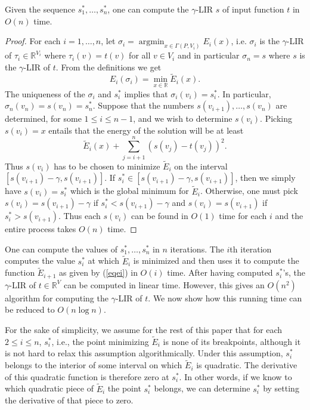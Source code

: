 \documentclass[11pt]{article}
\def\argmin{\mathop{\text{argmin}}}
\begin{document}
\begin{lemma}\label{lem:backsolve}
Given the sequence $s^*_1, \dots, s^*_n$, one can compute the $\gamma$-LIR $s$ of input function $t$ in $O(n)$ time. 
\end{lemma}
\begin{proof}For each $i = 1, \dots, n$, let $\sigma_{i} = \argmin_{x \in \Gamma(P, {V_i})} E_i(x)$, i.e. $\sigma_i$ is the $\gamma$-LIR of $\tau_i \in \mathbb{R}^{V_i}$ where $\tau_i(v) = t(v)$ for all $v \in V_i$ and in particular $\sigma_n = s$ where $s$ is the $\gamma$-LIR of $t$. From the definitions we get \[E_i(\sigma_i) = \min_{x \in \mathbb{R}} \tilde E_i(x).\]
The uniqueness of the $\sigma_i$ and $s^*_i$ implies that $\sigma_i(v_i) = s^*_i$. In particular, $\sigma_n(v_n) = s(v_n) = s^*_n$. Suppose that the numbers $s(v_{i+1}), \dots, s(v_{n})$ are determined, for some $1 \leq i \leq n - 1$, and we wish to determine $s(v_i)$. Picking $s(v_i) = x$ entails that the energy of the solution will be at least 
\[
\tilde E_i(x) + \sum_{j = i+1}^n (s(v_j) - t(v_j))^2.
\]
Thus $s(v_i)$ has to be chosen to minimize $\tilde E_i$ on the interval $[s(v_{i+1}) - \gamma, s(v_{i+1})]$. If $s^*_i \in [s(v_{i+1}) - \gamma, s(v_{i+1})]$, then we simply have $s(v_i) = s^*_i$ which is the global minimum for $\tilde E_i$. Otherwise, one must pick $s(v_i) = s(v_{i+1}) - \gamma$ if $s^*_i < s(v_{i+1}) - \gamma$ and $s(v_i) = s(v_{i+1})$ if $s^*_i > s(v_{i+1})$. Thus each $s(v_i)$ can be found in $O(1)$ time for each $i$ and the entire process takes $O(n)$ time.
\end{proof}


One can compute the values of $s^*_1, \dots, s^*_n$ in $n$ iterations. The $i$th iteration computes the value $s^*_i$ at which $\tilde E_i$ is minimized and then uses it to compute the function $\tilde E_{i+1}$ as given by (\ref{eqei}) in $O(i)$ time.  After having computed $s_i^*$'s, the $\gamma$-LIR of $t \in \mathbb{R}^V$ can be computed in linear time.  
However, this gives an $O(n^2)$ algorithm for computing the $\gamma$-LIR of $t$. We now show how this running time can be reduced to $O(n \log n)$.





For the sake of simplicity, we assume for the rest of this paper that 
for each $2 \leq i \leq n$, $s^*_i$, i.e., the point minimizing 
$\tilde E_i$ is none of its breakpoints, although it is not hard to 
relax this assumption algorithmically. 
Under this assumption, $s^*_i$ belongs to the interior of some interval on which $\tilde E_i$ is quadratic. The derivative of this quadratic function is therefore zero at $s^*_i$. In other words, if we know to which quadratic piece of $\tilde E_i$ the point $s^*_i$ belongs, we can determine $s^*_i$ by setting the derivative of that piece to zero. 
\end{document}

